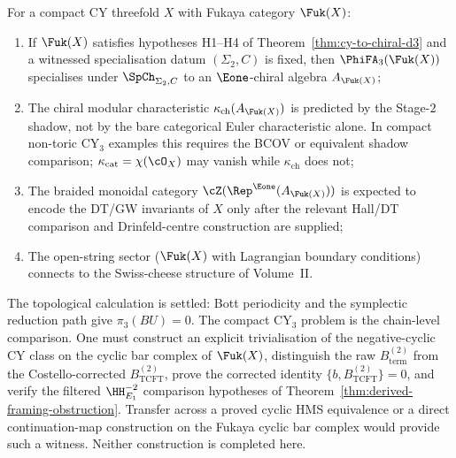 \begin{conjecture}
\label{conj:fukaya-cy3}
\ClaimStatusConjectured
For a compact CY threefold $X$ with Fukaya category $\Fuk(X)$:
\begin{enumerate}[label=(\roman*)]
 \item If $\Fuk(X)$ satisfies hypotheses \textup{H1--H4} of
 Theorem~\ref{thm:cy-to-chiral-d3} and a witnessed
 specialisation datum $(\Sigma_2,C)$ is fixed, then
 $\PhiFA_3(\Fuk(X))$ specialises under $\SpCh_{\Sigma_2, C}$ to an
 $\Eone$-chiral algebra $A_{\Fuk(X)}$;
 \item The chiral modular characteristic
 $\kappa_{\mathrm{ch}}(A_{\Fuk(X)})$ is predicted by the Stage-$2$
 shadow, not by the bare categorical Euler characteristic alone.
 In compact non-toric CY$_3$ examples this requires the BCOV or
 equivalent shadow comparison; $\kappa_{\mathrm{cat}}=\chi(\cO_X)$
 may vanish while $\kappa_{\mathrm{ch}}$ does not;
 \item The braided monoidal category
 $\cZ(\Rep^{\Eone}(A_{\Fuk(X)}))$ is expected to encode the
 DT/GW invariants of $X$ only after the relevant Hall/DT comparison
 and Drinfeld-centre construction are supplied;
 \item The open-string sector ($\Fuk(X)$ with Lagrangian boundary
 conditions) connects to the Swiss-cheese structure of Volume~II.
\end{enumerate}
\end{conjecture}

\begin{remark}
\label{rem:fukaya-cy3-condition-gap}
The topological calculation is settled: Bott periodicity and the
symplectic reduction path give $\pi_3(BU)=0$. The compact CY$_3$
problem is the chain-level comparison. One must construct an explicit
trivialisation of the negative-cyclic CY class on the cyclic bar
complex of $\Fuk(X)$, distinguish the raw
$B^{(2)}_{\mathrm{term}}$ from the Costello-corrected
$B^{(2)}_{\mathrm{TCFT}}$, prove the corrected identity
$\{b,B^{(2)}_{\mathrm{TCFT}}\}=0$, and verify the filtered
$\HH^{-2}_{E_1}$ comparison hypotheses of
Theorem~\ref{thm:derived-framing-obstruction}. Transfer across a
proved cyclic HMS equivalence or a direct continuation-map
construction on the Fukaya cyclic bar complex would provide such a
witness. Neither construction is completed here.
\end{remark}

